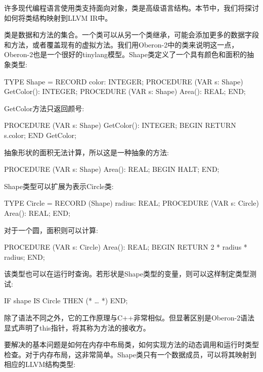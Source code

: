 
许多现代编程语言使用类支持面向对象，类是高级语言结构。本节中，我们将探讨如何将类结构映射到LLVM IR中。


类是数据和方法的集合。一个类可以从另一个类继承，可能会添加更多的数据字段和方法，或者覆盖现有的虚拟方法。我们用Oberon-2中的类来说明这一点，Oberon-2也是一个很好的tinylang模型。Shape类定义了一个具有颜色和面积的抽象类型:

\begin{shell}
TYPE Shape = RECORD
                color: INTEGER;
                PROCEDURE (VAR s: Shape) GetColor(): INTEGER;
                PROCEDURE (VAR s: Shape) Area(): REAL;
             END;
\end{shell}

GetColor方法只返回颜号:

\begin{shell}
PROCEDURE (VAR s: Shape) GetColor(): INTEGER;
BEGIN RETURN s.color; END GetColor;
\end{shell}

抽象形状的面积无法计算，所以这是一种抽象的方法:

\begin{shell}
PROCEDURE (VAR s: Shape) Area(): REAL;
BEGIN HALT; END;
\end{shell}

Shape类型可以扩展为表示Circle类:

\begin{shell}
TYPE Circle = RECORD (Shape)
                radius: REAL;
                PROCEDURE (VAR s: Circle) Area(): REAL;
              END;
\end{shell}

对于一个圆，面积则可以计算:

\begin{shell}
PROCEDURE (VAR s: Circle) Area(): REAL;
BEGIN RETURN 2 * radius * radius; END;
\end{shell}

该类型也可以在运行时查询。若形状是Shape类型的变量，则可以这样制定类型测试:

\begin{shell}
IF shape IS Circle THEN (* … *) END;
\end{shell}

除了语法不同之外，它的工作原理与C++非常相似。但显著区别是Oberon-2语法显式声明了this指针，将其称为方法的接收方。

要解决的基本问题是如何在内存中布局类，如何实现方法的动态调用和运行时类型检查。对于内存布局，这非常简单。Shape类只有一个数据成员，可以将其映射到相应的LLVM结构类型:


